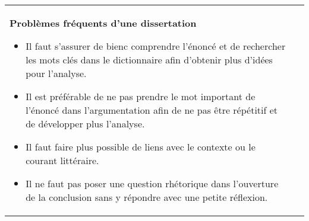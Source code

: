 \documentclass[11pt]{article}
\newcommand{\titre}[1]{{\Large\textbf{#1}}}
\begin{document}
\begin{tabularx}{\textwidth}{@{}XX@{}}
  \begin{minipage}[t]{\linewidth\fboxsep\fboxrule}
    \titre{Problèmes fréquents d'une dissertation}
    \begin{itemize} 
      \item Il faut s'assurer de bienc comprendre l'énoncé et de rechercher les mots clés dans le dictionnaire afin d'obtenir plus d'idées pour l'analyse.
      \item Il est préférable de ne pas prendre le mot important de l'énoncé dans l'argumentation afin de ne pas être répétitif et de développer plus l'analyse.
      \item Il faut faire plus possible de liens avec le contexte ou le courant littéraire.
      \item Il ne faut pas poser une question rhétorique dans l'ouverture de la conclusion sans y répondre avec une petite réflexion.
    \end{itemize}
  \end{minipage}\\
  
\end{tabularx}
\end{document}
